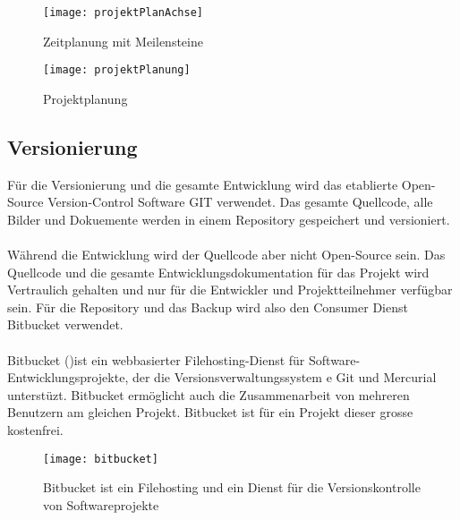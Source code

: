 \begin{figure}[htb!]
	\begin{center}
		\texttt{[image: projektPlanAchse]}
		\caption[Projektplanung Meilensteine]{Zeitplanung mit Meilensteine}
		\label{fig:projektPlanungAchse}
	\end{center}
\end{figure}


\begin{figure}[htb!]
	\begin{center}
		\texttt{[image: projektPlanung]}
		\caption[Projektplanung]{Projektplanung}
		\label{fig:projektPlanung}
	\end{center}
\end{figure}

\subsection{Versionierung}
Für die Versionierung und die gesamte Entwicklung wird das etablierte Open-Source Version-Control Software GIT verwendet. Das gesamte Quellcode, alle Bilder und Dokuemente werden in einem Repository gespeichert und versioniert.
\\
\\
Während die Entwicklung wird der Quellcode aber nicht Open-Source sein. Das Quellcode und die gesamte Entwicklungsdokumentation für das Projekt wird Vertraulich gehalten und nur für die Entwickler und Projektteilnehmer verfügbar sein. Für die Repository und das Backup wird also den Consumer Dienst Bitbucket verwendet.
\\
\\
Bitbucket ()ist ein webbasierter Filehosting-Dienst für Software-Entwicklungsprojekte, der die Versionsverwaltungssystem e Git und Mercurial unterstüzt. Bitbucket ermöglicht auch die Zusammenarbeit von mehreren Benutzern am gleichen Projekt. Bitbucket ist für ein Projekt dieser grosse kostenfrei.
\begin{figure}[htb!]
	\begin{center}
		\texttt{[image: bitbucket]}
		\caption[Bitbucket ist ein Filehosting und ein Dienst für die Versionskontrolle von Softwareprojekte]{Bitbucket ist ein Filehosting und ein Dienst für die Versionskontrolle von Softwareprojekte}
		\label{fig:bitbucket}
	\end{center}
\end{figure}
\newpage

